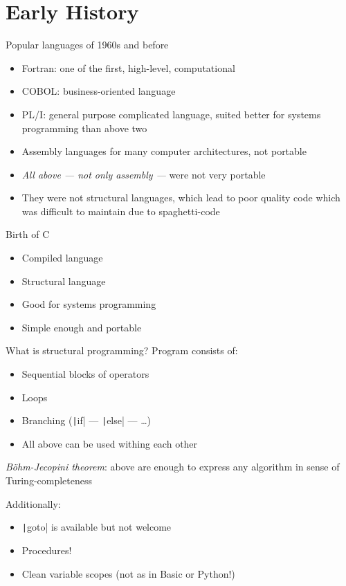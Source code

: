 \documentclass[xetex,aspectratio=149]{beamer}
\begin{document}
\section{Early History}

\begin{frame}{Popular languages of 1960s and before}
	\begin{itemize}
		\item Fortran: one of the first, high-level, computational
		\item COBOL: business-oriented language
		\item PL/I: general purpose complicated language, suited better for systems programming than above two
		\item Assembly languages for many computer architectures, not portable
	\end{itemize}

\pause

	\begin{itemize}
		\item \emph{All above --- not only assembly ---} were not very portable
		\item They were not structural languages, which lead to poor quality code which was difficult to maintain due to spaghetti-code
	\end{itemize}
\end{frame}

\begin{frame}{Birth of C}
	\begin{itemize}
		\item Compiled language
		\item Structural language
		\item Good for systems programming
		\item Simple enough and portable
	\end{itemize}
\end{frame}

\begin{frame}{What is structural programming?}
	Program consists of:
	\begin{itemize}
		\item Sequential blocks of operators
		\item Loops
		\item Branching (\texttt|if| --- \texttt|else| --- \ldots)
		\item All above can be used withing each other
	\end{itemize}
	\pause

	\emph{B\"{o}hm-Jecopini theorem}: above are enough to express any algorithm in sense of Turing-completeness
	\pause
	
	Additionally:
	\begin{itemize}
		\item \texttt|goto| is available but not welcome
		\item Procedures!
		\item Clean variable scopes (not as in Basic or Python!)
	\end{itemize}
\end{frame}
\end{document}
